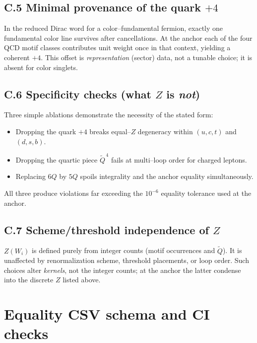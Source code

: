 \documentclass[epjc3]{svjour3}
\begin{document}
\subsection*{C.5 Minimal provenance of the quark \texorpdfstring{$+4$}{+4}}
In the reduced Dirac word for a color–fundamental fermion, exactly one fundamental color line survives after cancellations. At the anchor each of the four QCD motif classes contributes unit weight once in that context, yielding a coherent $+4$. This offset is \emph{representation} (sector) data, not a tunable choice; it is absent for color singlets.

\subsection*{C.6 Specificity checks (what $Z$ is \emph{not})}
Three simple ablations demonstrate the necessity of the stated form:
\begin{itemize}
  \item Dropping the quark $+4$ breaks equal–$Z$ degeneracy within $(u,c,t)$ and $(d,s,b)$.
  \item Dropping the quartic piece $\tilde Q^{\,4}$ fails at multi–loop order for charged leptons.
  \item Replacing $6Q$ by $5Q$ spoils integrality and the anchor equality simultaneously.
\end{itemize}
All three produce violations far exceeding the $10^{-6}$ equality tolerance used at the anchor.

\subsection*{C.7 Scheme/threshold independence of $Z$}
$Z(W_i)$ is defined purely from integer counts (motif occurrences and $\tilde Q$). It is unaffected by renormalization scheme, threshold placements, or loop order. Such choices alter \emph{kernels}, not the integer counts; at the anchor the latter condense into the discrete $Z$ listed above.

\section{Equality CSV schema and CI checks}
\end{document}
